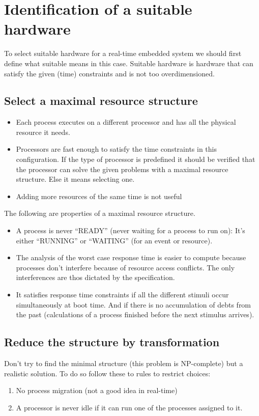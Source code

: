 \documentclass[../main.tex]{subfiles}
\begin{document}
\chapter{Identification of a suitable hardware}
To select suitable hardware for a real-time embedded system we should first define what suitable means in this case. Suitable hardware is hardware that can satisfy the given (time) constraints and is not too overdimensioned.

\section{Select a maximal resource structure}

\begin{itemize}
	\item Each process executes on a different processor and has all the physical resource it needs.
	\item Processors are fast enough to satisfy the time constraints in this configuration. If the type of processor is predefined it should be verified that the processor can solve the given problems with a maximal resource structure. Else it means selecting one.
	\item Adding more resources of the same time is not useful
\end{itemize}

The following are properties of a maximal resource structure.
\begin{itemize}
	\item A process is never ``READY'' (never waiting for a process to run on): It's either ``RUNNING'' or ``WAITING'' (for an event or resource).
	\item The analysis of the worst case response time is easier to compute because processes don't interfere because of resource access conflicts. The only interferences are thos dictated by the specification.
	\item It satisfies response time constraints if all the different stimuli occur simultaneously at boot time. And if there is no accumulation of debts from the past (calculations of a process finished before the next stimulus arrives).
\end{itemize}

\section{Reduce the structure by transformation}
Don't try to find the minimal structure (this problem is NP-complete) but a realistic solution. 
To do so follow these to rules to restrict choices:
\begin{enumerate}
	\item No process migration (not a good idea in real-time)
	\item A processor is never idle if it can run one of the processes assigned to it.
\end{enumerate}
\end{document}

